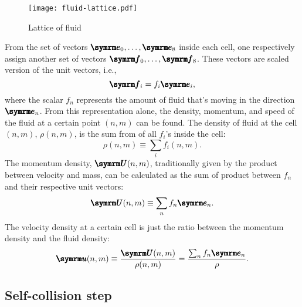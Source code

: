 \begin{figure}[ht]
	\centering
	\texttt{[image: fluid-lattice.pdf]}
	\caption{Lattice of fluid}
	\label{fig:fluid-lattice}
\end{figure}

From the set of vectors $\vv{e}_0, \dots, \vv{e}_8$ inside each cell, one respectively assign another set of vectors $\vv{f}_0, \dots, \vv{f}_8$. These vectors are scaled version of the unit vectors, i.e.,
\begin{equation}
	\vv{f}_i = f_i\vv{e}_i,
\end{equation}
where the scalar $f_n$ represents the amount of fluid that's moving in the direction $\vv{e}_n$. From this representation alone, the density, momentum, and speed of the fluid at a certain point $(n, m)$ can be found. The density of fluid at the cell $(n, m)$, $\rho(n, m)$, is the sum from of all $f_i$'s inside the cell:
\begin{equation}
	\rho(n, m) \equiv \sum_if_i(n, m). \label{eq:density-calculation}
\end{equation}
The momentum density, $\vv{U}(n, m)$, traditionally given by the product between velocity and mass, can be calculated as the sum of product between $f_n$ and their respective unit vectors:
\begin{equation}
	\vv{U}(n, m) \equiv \sum_nf_n\vv{e}_n. \label{eq:momentum-calculation}
\end{equation}
The velocity density at a certain cell is just the ratio between the momentum density and the fluid density:
\begin{equation}
	\vv{u}(n, m) \equiv \frac{\vv{U}(n, m)}{\rho(n, m)} = \frac{\sum_nf_n\vv{e}_n}{\rho}. \label{eq:velocity-calculation}
\end{equation}

\subsection{Self-collision step}

